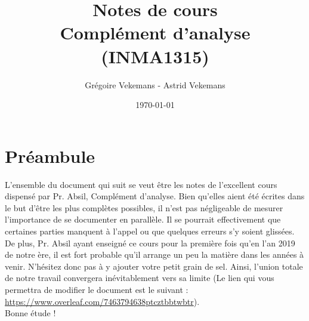 \documentclass[a4paper,twosides,11pt]{article}
\title{\Huge{Notes de cours \\ Complément d'analyse (INMA1315)}}
\author{\Large{Grégoire Vekemans - Astrid Vekemans}}
\date{\Large{\today}}
\theoremstyle{remark}
\theoremstyle{definition}
\theoremstyle{definition}
\theoremstyle{definition}
\theoremstyle{remark}
\begin{document}
\maketitle

\section*{Préambule}

L'ensemble du document qui suit se veut être les notes de l'excellent cours dispensé par Pr. Absil, Complément d'analyse. Bien qu'elles aient été écrites dans le but d'être les plus complètes possibles, il n'est pas négligeable de mesurer l'importance de se documenter en parallèle. Il se pourrait effectivement que certaines parties manquent à l'appel ou que quelques erreurs s'y soient glissées. De plus, Pr. Absil ayant enseigné ce cours pour la première fois qu'en l'an 2019 de notre ère, il est fort probable qu'il arrange un peu la matière dans les années à venir. N'hésitez donc pas à y ajouter votre petit grain de sel. Ainsi, l'union totale de notre travail convergera inévitablement vers sa limite (Le lien qui vous permettra de modifier le document est le suivant : \url{https://www.overleaf.com/7463794638ptcztbbtwbtr}).\\ Bonne étude !

\tableofcontents



%


 
\end{document}
